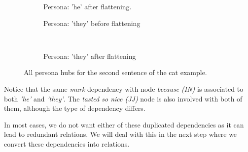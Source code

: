 \begin{figure}[H]
\begin{subfigure}[t]{0.9\textwidth}
\begin{tikzpicture}[->, node distance=3cm,main node/.style={circle, draw, font=\sffamily\bfseries}]
        \end{tikzpicture}
    \caption{Persona: 'he' after flattening.}
\end{subfigure}
\begin{subfigure}[t]{0.45\textwidth}
	\centering
    \caption{Persona: 'they' before flattening}
\end{subfigure}
~
\begin{subfigure}[t]{0.45\textwidth}
	\centering
    \caption{Persona: 'they' after flattening}
\end{subfigure}
\caption{All persona hubs for the second sentence of the cat example.}
\label{fig:second-hubs}
\end{figure}

Notice that the same \textit{mark} dependency with node \textit{because (IN)} is associated to both \textit{'he'} and \textit{'they'}. The \textit{tasted so nice (JJ)} node is also involved with both of them, although the type of dependency differs.

In most cases, we do not want either of these duplicated dependencies as it can lead to redundant relations. We will deal with this in the next step where we convert these dependencies into relations.

